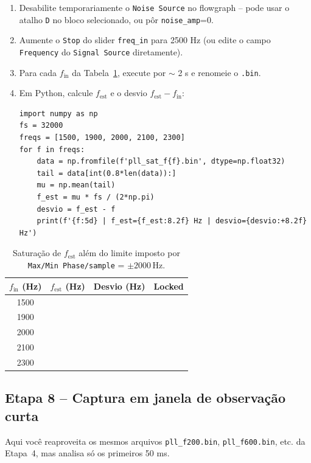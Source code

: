 \documentclass[11pt,a4paper]{article}
\begin{document}
\begin{instrucao}
\begin{enumerate}[label=\arabic*.]
  \item Desabilite temporariamente o \texttt{Noise Source} no flowgraph
    -- pode usar o atalho \texttt{D} no bloco selecionado, ou pôr
    \texttt{noise\_amp}=0.
  \item Aumente o \texttt{Stop} do slider \texttt{freq\_in} para 2500 Hz
    (ou edite o campo \texttt{Frequency} do \texttt{Signal Source}
    diretamente).
  \item Para cada $f_\text{in}$ da Tabela~\ref{tab:saturacao}, execute
    por $\sim$ 2 s e renomeie o \texttt{.bin}.
  \item Em Python, calcule $f_\text{est}$ e o desvio $f_\text{est} - f_\text{in}$:
\begin{verbatim}
import numpy as np
fs = 32000
freqs = [1500, 1900, 2000, 2100, 2300]
for f in freqs:
    data = np.fromfile(f'pll_sat_f{f}.bin', dtype=np.float32)
    tail = data[int(0.8*len(data)):]
    mu = np.mean(tail)
    f_est = mu * fs / (2*np.pi)
    desvio = f_est - f
    print(f'{f:5d} | f_est={f_est:8.2f} Hz | desvio={desvio:+8.2f} Hz')
\end{verbatim}
\end{enumerate}
\end{instrucao}

\begin{table}[H]
  \centering
  \begin{tabular}{c c c c}
    \toprule
    $f_\text{in}$ (Hz) & $f_\text{est}$ (Hz) & Desvio (Hz) & Locked \\
    \midrule
    1500 & & & \\
    1900 & & & \\
    2000 & & & \\
    2100 & & & \\
    2300 & & & \\
    \bottomrule
  \end{tabular}
  \caption{Saturação de $f_\text{est}$ além do limite imposto por \texttt{Max/Min Phase/sample} = $\pm 2000$\,Hz.}
  \label{tab:saturacao}
\end{table}

\subsection*{Etapa 8 -- Captura em janela de observação curta}

Aqui você reaproveita os mesmos arquivos \texttt{pll\_f200.bin},
\texttt{pll\_f600.bin}, etc. da Etapa~4, mas analisa só os primeiros
50 ms.
\end{document}
